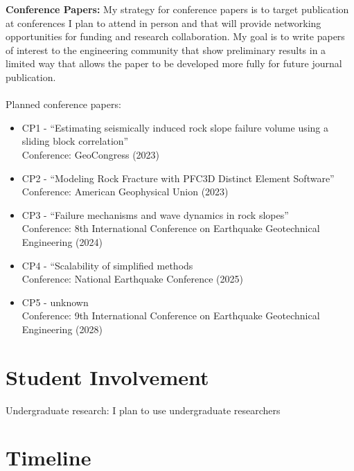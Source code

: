 \documentclass[10pt,letterpaper]{article}
\begin{document}
\noindent \textbf{Conference Papers:} My strategy for conference papers is to target publication at conferences I plan to attend in person and that will provide networking opportunities for funding and research collaboration.
My goal is to write papers of interest to the engineering community that show preliminary results in a limited way that allows the paper to be developed more fully for future journal publication.
\\
\\
\noindent Planned conference papers:
\begin{itemize}
\item CP1 - ``Estimating seismically induced rock slope failure volume using a sliding block correlation''
\\Conference: GeoCongress (2023)
\item CP2 - ``Modeling Rock Fracture with PFC3D Distinct Element Software''
\\Conference: American Geophysical Union (2023)
\item CP3 - ``Failure mechanisms and wave dynamics in rock slopes''
\\ Conference: 8th International Conference on Earthquake Geotechnical Engineering (2024)
\item CP4 - ``Scalability of simplified methods
\\ Conference: National Earthquake Conference (2025)
\item CP5 - unknown
\\ Conference: 9th International Conference on Earthquake Geotechnical Engineering (2028)
\end{itemize}

\section{Student Involvement}
Undergraduate research: I plan to use undergraduate researchers

\section{Timeline}
\end{document}
